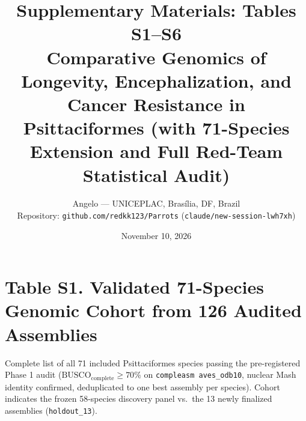 \documentclass[9pt,a4paper]{article}
\title{\textbf{\Large Supplementary Materials: Tables S1--S6}\\[4pt]\large Comparative Genomics of Longevity, Encephalization, and Cancer Resistance in Psittaciformes (with 71-Species Extension and Full Red-Team Statistical Audit)}
\author{Angelo --- UNICEPLAC, Bras\'ilia, DF, Brazil \\ Repository: \texttt{github.com/redkk123/Parrots} (\texttt{claude/new-session-lwh7xh})}
\date{November 10, 2026}
\begin{document}
\maketitle
\tableofcontents
\clearpage
\section*{Table S1. Validated 71-Species Genomic Cohort from 126 Audited Assemblies}
Complete list of all 71 included Psittaciformes species passing the pre-registered Phase 1 audit ($\text{BUSCO}_{\text{complete}} \ge 70\%$ on \texttt{compleasm aves\_odb10}, nuclear Mash identity confirmed, deduplicated to one best assembly per species). Cohort indicates the frozen 58-species discovery panel vs.\ the 13 newly finalized assemblies (\texttt{holdout\_13}).
\end{document}
